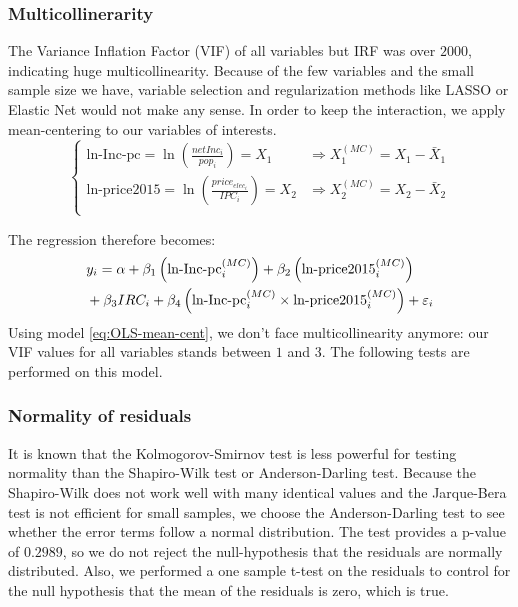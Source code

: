 \subsubsection{Multicollinerarity}
The Variance Inflation Factor (VIF) of all variables but IRF was over $2000$, indicating huge multicollinearity. Because of the few variables and the small sample size we have, variable selection and regularization methods like LASSO or Elastic Net would not make any sense. In order to keep the interaction, we apply mean-centering to our variables of interests.
\begin{equation} \label{eq:mean-cent-operator}
    \begin{cases}
    \text{ln-Inc-pc} = \ln{\left(\frac{{netInc_i}}{pop_i}\right)} = X_1 & \Rightarrow {X}_1^{(MC)} = X_1 - \bar{X}_1\\
    \text{ln-price2015} = \ln{\left(\frac{price_{elec_i}}{IPC_i}\right)} = X_2 & \Rightarrow {X}_2^{(MC)} = X_2 - \bar{X}_2\\
    \end{cases}
\end{equation}

The regression therefore becomes: 
\begin{align} \label{eq:OLS-mean-cent}
    & y_i = \alpha + \beta_1 \left(\text{ln-Inc-pc}_i^{(MC)}\right) + \beta_2 \left(\text{ln-price2015}_i^{(MC)}\right) \notag \\
    & + \beta_3 IRC_i + \beta_4 \left(\text{ln-Inc-pc}_i^{(MC)} \times \text{ln-price2015}_i^{(MC)}\right) + \varepsilon_i
\end{align}
Using model \eqref{eq:OLS-mean-cent}, we don't face multicollinearity anymore: our VIF values for all variables stands between $1$ and $3$. The following tests are performed on this model.

\subsubsection{Normality of residuals}
It is known that the Kolmogorov-Smirnov test is less powerful for testing normality than the Shapiro-Wilk test or Anderson-Darling test. Because the Shapiro-Wilk does not work well with many identical values and the Jarque-Bera test is not efficient for small samples, we choose the Anderson-Darling test to see whether the error terms follow a normal distribution. The test provides a p-value of $0.2989$, so we do not reject the null-hypothesis that the residuals are normally distributed. Also, we performed a one sample t-test on the residuals to control for the null hypothesis that the mean of the residuals is zero, which is true.

